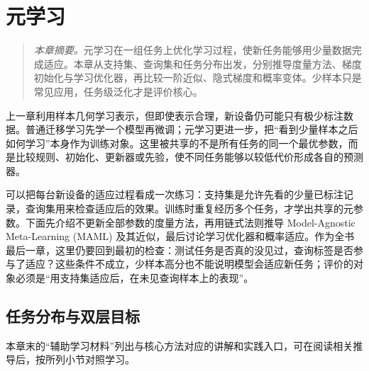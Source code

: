 \chapter{元学习}
\label{chap:meta}
\begin{quote}\small
\textit{本章摘要。}元学习在一组任务上优化学习过程，使新任务能够用少量数据完成适应。本章从支持集、查询集和任务分布出发，分别推导度量方法、梯度初始化与学习优化器，再比较一阶近似、隐式梯度和概率变体。少样本只是常见应用，任务级泛化才是评价核心。
\end{quote}

上一章利用样本几何学习表示，但即使表示合理，新设备仍可能只有极少标注数据。普通迁移学习先学一个模型再微调；元学习更进一步，把“看到少量样本之后如何学习”本身作为训练对象。这里被共享的不是所有任务的同一个最优参数，而是比较规则、初始化、更新器或先验，使不同任务能够以较低代价形成各自的预测器。

可以把每台新设备的适应过程看成一次练习：支持集是允许先看的少量已标注记录，查询集用来检查适应后的效果。训练时重复经历多个任务，才学出共享的元参数。下面先介绍不更新全部参数的度量方法，再用链式法则推导 Model-Agnostic Meta-Learning (MAML) 及其近似，最后讨论学习优化器和概率适应。作为全书最后一章，这里仍要回到最初的检查：测试任务是否真的没见过，查询标签是否参与了适应？这些条件不成立，少样本高分也不能说明模型会适应新任务；评价的对象必须是“用支持集适应后，在未见查询样本上的表现”。

\section{任务分布与双层目标}

本章末的“辅助学习材料”列出与核心方法对应的讲解和实践入口，可在阅读相关推导后，按所列小节对照学习。

